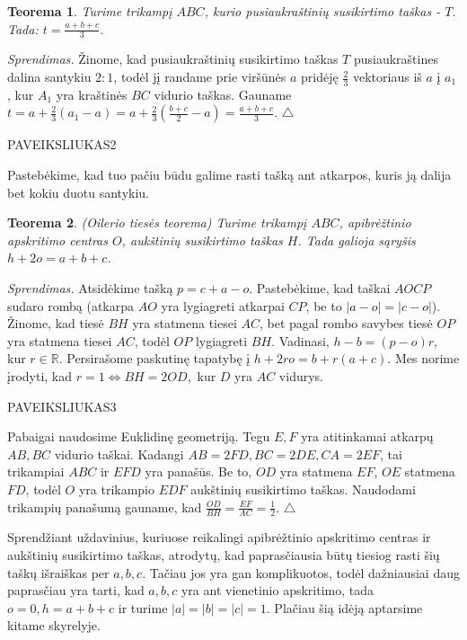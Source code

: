 \documentclass[11pt,a4paper,twoside]{book}
\newenvironment{sprendimas}{\noindent \textit{Sprendimas.}}{\hfill $\triangle$}
\newtheorem{thmnr}{Teorema}
\theoremstyle{definition} \newtheorem*{api}{Apibrėžimas}
\theoremstyle{remark} \newtheorem*{pastaba}{Pastaba}
\begin{document}
\begin{thmnr}
Turime trikampį $ABC$, kurio pusiaukraštinių susikirtimo taškas - $T$. Tada:
$t = \frac{a+b+c}{3}$.
\end{thmnr}
\begin{sprendimas}
Žinome, kad pusiaukraštinių susikirtimo taškas $T$ pusiaukraštines dalina santykiu $2:1$, todėl jį randame prie viršūnės $a$ pridėję $\frac{2}{3}$ vektoriaus iš $a$ į $a_1$, kur $A_1$ yra kraštinės $BC$ vidurio taškas. Gauname $t=a+\frac{2}{3}(a_1-a)=a+\frac{2}{3}(\frac{b+c}{2}-a)=\frac{a+b+c}{3}$.
\end{sprendimas}

PAVEIKSLIUKAS2

Pastebėkime, kad tuo pačiu būdu galime rasti tašką ant atkarpos, kuris ją dalija bet kokiu duotu santykiu.



\begin{thmnr}\textit{(Oilerio tiesės teorema)}
Turime trikampį $ABC$, apibrėžtinio apskritimo centras $O$, aukštinių susikirtimo taškas $H$. Tada galioja sąryšis
$h + 2o = a + b + c$.
\end{thmnr}
\begin{sprendimas}
Atsidėkime tašką $p=c+a-o$. Pastebėkime, kad taškai $AOCP$ sudaro rombą (atkarpa $AO$ yra lygiagreti atkarpai $CP$, be to $|a-o|=|c-o|$). Žinome, kad tiesė $BH$ yra statmena tiesei $AC$, bet pagal rombo savybes tiesė $OP$ yra statmena tiesei $AC$, todėl $OP$ lygiagreti $BH$. Vadinasi, $h-b=(p-o)r$, kur $r \in \mathbb{R}$. Persirašome paskutinę tapatybę į $h+2ro=b+r(a+c)$. Mes norime įrodyti, kad $r=1 \Leftrightarrow BH=2OD,$ kur $D$ yra $AC$ vidurys. 

PAVEIKSLIUKAS3


Pabaigai naudosime Euklidinę geometriją. Tegu $E, F$ yra atitinkamai atkarpų $AB, BC$ vidurio taškai. Kadangi $AB=2FD, BC=2DE, CA=2EF$, tai trikampiai $ABC$ ir $EFD$ yra panašūs. Be to, $OD$ yra statmena $EF$, $OE$ statmena $FD$, todėl $O$ yra trikampio $EDF$ aukštinių susikirtimo taškas. Naudodami trikampių panašumą gauname, kad $\frac{OD}{BH}=\frac{EF}{AC}=\frac{1}{2}.$ 
\end{sprendimas}

Sprendžiant uždavinius, kuriuose reikalingi apibrėžtinio apskritimo centras ir aukštinių susikirtimo taškas, atrodytų, kad paprasčiausia būtų tiesiog rasti šių taškų išraiškas per $a, b, c.$ Tačiau jos yra gan komplikuotos, todėl dažniausiai daug paprasčiau yra tarti, kad $a, b, c$ yra ant vienetinio apskritimo, tada $o=0, h=a+b+c$ ir turime $|a|=|b|=|c|=1$. Plačiau šią idėją aptarsime kitame skyrelyje.
\end{document}
